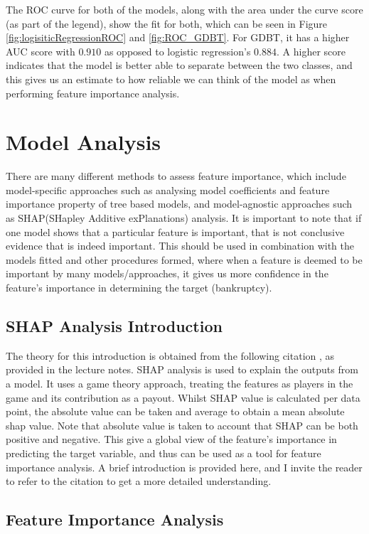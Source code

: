 \documentclass[11pt]{article}
\begin{document}
The ROC curve for both of the models, along with the area under the curve score (as part of the legend), show the fit for both, which can be seen in Figure \ref{fig:logisiticRegressionROC} and \ref{fig:ROC_GDBT}. For GDBT, it has a higher AUC score with $0.910$ as opposed to logistic regression's $0.884$. A higher score indicates that the model is better able to separate between the two classes, and this gives us an estimate to how reliable we can think of the model as when performing feature importance analysis. 

\section{Model Analysis}
There are many different methods to assess feature importance, which include model-specific approaches such as analysing model coefficients and feature importance property of tree based models, and model-agnostic approaches such as SHAP(SHapley Additive exPlanations) analysis. It is important to note that if one model shows that a particular feature is important, that is not conclusive evidence that is indeed  important. This should be used in combination with the models fitted and other procedures formed, where when a feature is deemed to be important by many models/approaches, it gives us more confidence in the feature's importance in determining the target (bankruptcy). 

\subsection{SHAP Analysis Introduction}
The theory for this introduction is obtained from the following citation \cite{shap_introduction}, as provided in the lecture notes. SHAP analysis is used to explain the outputs from a model. It uses a game theory approach, treating the features as players in the game and its contribution as a payout. Whilst SHAP value is calculated per data point, the absolute value can be taken and average to obtain a mean absolute shap value. Note that absolute value is taken to account that SHAP can be both positive and negative. This give a global view of the feature's importance in predicting the target variable, and thus can be used as a tool for feature importance analysis. A brief introduction is provided here, and I invite the reader to refer to the citation to get a more detailed understanding.

\subsection{Feature Importance Analysis}
\end{document}
